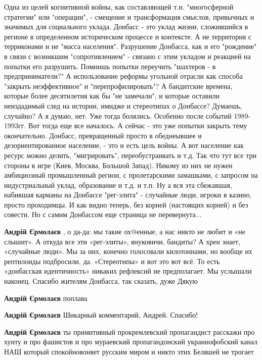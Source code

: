 \begin{itemize}
\begin{itemize}
Одна из целей когнитивной войны, как составляющей т.н. "многосферной стратегии"
или "операции", - смещение и трансформация смыслов, привычных и значимых для
социального уклада. Донбасс - это уклад жизни, сложившийся в регионе в
определенном историческом процессе и контексте. А не территория с терриконами и
не "масса населения". Разрушение Донбасса, как и его "рождение" в связи с
возникшим "сопротивлением" - связано с этим укладом и реакцией на попытки его
разрушить. Помнишь попытки переучить "шахтеров - в предприниматели?" А
использование реформы угольной отрасли как способа "закрыть неэффективное" и
"перепрофилировать"? А бандитские времена, которые более десятилетия как бы "не
замечали", и которые оставили неиздадимый след на истории, имидже и стереотипах
о Донбассе? Думаешь, случайно? А я думаю, нет. Уже тогда болялись. Особенно
после событий 1989-1993гг. Вот тогда еще все началось. А сейчас - это уже
попытки закрыть тему окончательно. Донбасс, превращенный просто в обеднеывшее и
дезориентированное население, - это и есть цель войны. А вот население как
ресурс можно делить, "мигрировать", переобустраивать и т.д. Так что тут все три
стороны в игре (Киев, Москва, Большой Запад). Никому из них не нужен
амбициозный промышленный регион, с пролетарскими замашками, с запросом на
индустриальный уклад, образование и т.д. и т.п. Ну а вся эта сбежавшая,
набившая карманы на Донбассе "рег-элита" - случайные люди, игроки в казино,
просто проходимцы. И как видно теперь, без корней (настоящих корней) и без
совести. Но с самим Донбассом еще страница не перевернута...

\textbf{Андрій Єрмолаєв} , о да-да: мы такие ох@енные, а нас никто не любит и «не слышит». А откуда все эти «рег-элиты», януковичи, бандиты? А хрен знает, «случайные люди». Мы за них, конечно голосовали килотоннами, но вообще их рептилоиды подбросили, да. «Стереотипы» и вот это вот всё.
То есть «донбасская идентичность» никаких рефлексий не предполагает. Мы услышали наконец.
Спасибо жителям Донбасса, так сказать, дуже Дякую

\textbf{Андрій Єрмолаєв} поплава


\textbf{Андрій Єрмолаєв} Шикарный комментарий, Андрей. Спасибо!

\textbf{Андрій Єрмолаєв} ты примитивный прокремлевский пропагандист расскажи про хунту и про фашистов и про мураевский пропагандонский украинофобский канал НАШ который спокойновоняет русским миром и никто этих Беляшей не трогает


\end{itemize}
\end{itemize}
